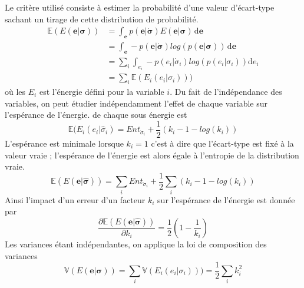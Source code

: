 \documentclass[../main/These_Mathias_Paget.tex]{subfiles}
\begin{document}
Le critère utilisé consiste à estimer la probabilité d'une valeur d’écart-type sachant un tirage de cette distribution de probabilité.
\begin{equation}
\begin{aligned}
\mathbb{E}(E(\boldsymbol{e}|\boldsymbol{\sigma})) &= \int_{\boldsymbol{e}} p(\boldsymbol{e}| \boldsymbol{\dot{\sigma}}) E(\boldsymbol{e}|\boldsymbol{\sigma}) \, \mathrm d\boldsymbol{e} \\
&= \int_{\boldsymbol{e}} -p(\boldsymbol{e}| \boldsymbol{\dot{\sigma}}) log( p(\boldsymbol{e}|\boldsymbol{\sigma})) \, \mathrm d\boldsymbol{e} \\
&= \sum_{i}{\int_{e_i} -p(e_i|\dot{\sigma}_i)log(p(e_i|\sigma_i)) \mathrm de_i} \\
&= \sum_{i}{\mathbb{E}(E_i(e_i|\sigma_i)))}
\end{aligned}
\end{equation}
où les $E_i$ est l’énergie défini pour la variable $i$. Du fait de l'indépendance des variables, on peut étudier indépendamment l'effet de chaque variable sur l’espérance de l'énergie.  de chaque sous énergie est
\begin{equation}
\mathbb{E}(E_i(e_i|\hat{\sigma}_i) = Ent_{\dot{\sigma}_i} + \frac{1}{2}( k_i -1 -log(k_i))
\end{equation}
L'espérance est minimale lorsque $k_i=1$ c'est à dire que l'écart-type est fixé à la valeur vraie ; l’espérance de l'énergie est alors égale à l'entropie de la distribution vraie.
\begin{equation}
\mathbb{E}(E(\boldsymbol{e}|\boldsymbol{\hat{\sigma}})) = \sum_{i}{ Ent_{\dot{\sigma}_i}} + \frac{1}{2}\sum_{i}( k_i -1 - log(k_i))
\end{equation}
Ainsi l'impact d'un erreur d'un facteur $k_i$ sur l'espérance de l’énergie est donnée par
\begin{equation}
\frac{\partial \mathbb{E}(E(\boldsymbol{e}|\boldsymbol{\hat{\sigma}}))}{\partial k_i} = \frac{1}{2}( 1 - \frac{1}{k_i})
\end{equation}
Les variances étant indépendantes, on applique la loi de composition des variances
\begin{equation}
\mathbb{V}(E(\boldsymbol{e}|\boldsymbol{\sigma})) = \sum_{i}{\mathbb{V}(E_i(e_i|\sigma_i)))} = \frac{1}{2}\sum_{i}{k_i^{2}}
\end{equation}
\end{document}

